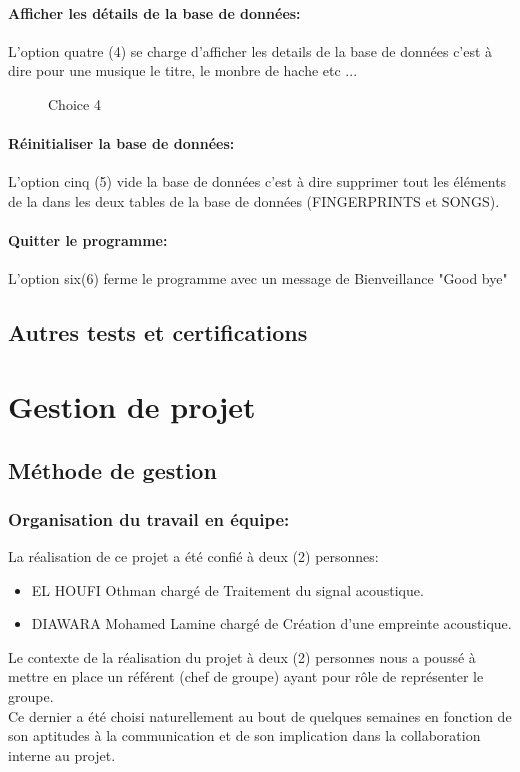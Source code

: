 \documentclass[11pt, report, french]{scrreprt}
\begin{document}
\subsubsection{Afficher les détails de la base de données:}
L'option quatre (4) se charge d'afficher les details de la base de données c'est à dire pour une musique le titre, le monbre de hache etc ...
\begin{figure}[H]
	\centering
	\caption{Choice 4}
\end{figure}
\subsubsection{Réinitialiser la base de données:}
L'option cinq (5) vide la base de données c'est à dire supprimer tout les éléments de la dans les deux tables de la base de données (FINGERPRINTS et SONGS). 
\subsubsection{Quitter le programme:}
L'option six(6) ferme le programme avec un message de Bienveillance "Good bye"

\section{Autres tests et certifications}

\chapter{Gestion de projet}
\section{Méthode de gestion}
\subsection{Organisation du travail en équipe:}
La réalisation de ce projet a été confié à deux (2) personnes:
\begin{itemize}
	\item EL HOUFI Othman chargé de Traitement du signal acoustique.
	\item DIAWARA Mohamed Lamine chargé de Création d’une empreinte acoustique.\\
	\end {itemize}
	Le contexte de la réalisation du projet à deux (2) personnes nous a poussé à
	mettre en place un référent (chef de groupe) ayant pour rôle de représenter le groupe.\\
	Ce dernier a été choisi naturellement au bout de quelques semaines en fonction de son aptitudes à la communication et de son implication dans la collaboration interne au projet.\\\par
	
\end{document}
